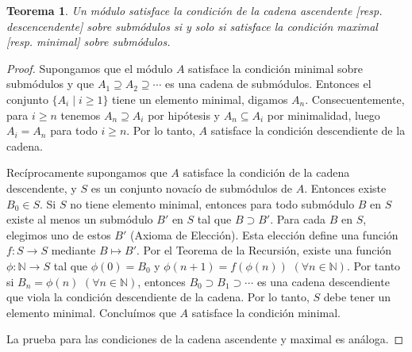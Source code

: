 \documentclass{report}
\newcommand{\naturalNumbers}{\mathbb{N}}
\newtheorem{theorem}{Teorema}
\begin{document}
  \begin{theorem}
    \label{theorem:equivalenceOfChainConditions}
    Un módulo satisface la condición de la cadena ascendente [resp. descencendente] sobre submódulos si y solo si satisface la condición maximal [resp. minimal] sobre submódulos.
  \end{theorem}
  \begin{proof}
    Supongamos que el módulo \(A\) satisface la condición minimal sobre submódulos y que \(A_1 \supseteq A_2 \supseteq \cdots\) es una cadena de submódulos.
    Entonces el conjunto \(\{A_i \mid i \geq 1\}\) tiene un elemento minimal, digamos \(A_n\).
    Consecuentemente, para \(i \geq n\) tenemos \(A_n \supseteq A_i\) por hipótesis y \(A_n \subseteq A_i\) por minimalidad, luego \(A_i = A_n\) para todo \(i \geq n\).
    Por lo tanto, \(A\) satisface la condición descendiente de la cadena.

    Recíprocamente supongamos que \(A\) satisface la condición de la cadena descendente, y \(S\) es un conjunto novacío de submódulos de \(A\).
    Entonces existe \(B_0 \in S\).
    Si \(S\) no tiene elemento minimal, entonces para todo submódulo \(B\) en \(S\) existe al menos un submódulo \(B'\) en \(S\) tal que \(B \supset B'\).
    Para cada \(B\) en \(S\), elegimos uno de estos \(B'\) (Axioma de Elección).
    Esta elección define una función \(f : S \rightarrow S\) mediante \(B \mapsto B'\).
    Por el Teorema de la Recursión, existe una función \(\phi : \naturalNumbers \rightarrow S\) tal que \(\phi(0) = B_0\) y \(\phi(n + 1) = f(\phi(n))\) \((\forall n \in \naturalNumbers)\).
    Por tanto si \(B_n = \phi(n)\) \((\forall n \in \naturalNumbers)\), entonces \(B_0 \supset B_1 \supset \cdots\) es una cadena descendiente que viola la condición descendiente de la cadena.
    Por lo tanto, \(S\) debe tener un elemento minimal.
    Concluímos que \(A\) satisface la condición minimal.

    La prueba para las condiciones de la cadena ascendente y maximal es análoga.
  \end{proof}
\end{document}
